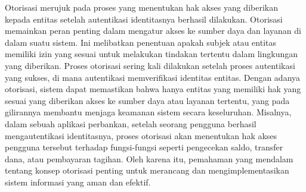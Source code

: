 Otorisasi merujuk pada proses yang menentukan hak akses yang diberikan kepada entitas setelah autentikasi identitasnya berhasil dilakukan. Otorisasi memainkan peran penting dalam mengatur akses ke sumber daya dan layanan di dalam suatu sistem. Ini melibatkan penentuan apakah subjek atau entitas memiliki izin yang sesuai untuk melakukan tindakan tertentu dalam lingkungan yang diberikan. Proses otorisasi sering kali dilakukan setelah proses autentikasi yang sukses, di mana autentikasi memverifikasi identitas entitas. Dengan adanya otorisasi, sistem dapat memastikan bahwa hanya entitas yang memiliki hak yang sesuai yang diberikan akses ke sumber daya atau layanan tertentu, yang pada gilirannya membantu menjaga keamanan sistem secara keseluruhan. Misalnya, dalam sebuah aplikasi perbankan, setelah seorang pengguna berhasil mengautentikasi identitasnya, proses otorisasi akan menentukan hak akses pengguna tersebut terhadap fungsi-fungsi seperti pengecekan saldo, transfer dana, atau pembayaran tagihan. Oleh karena itu, pemahaman yang mendalam tentang konsep otorisasi penting untuk merancang dan mengimplementasikan sistem informasi yang aman dan efektif.
